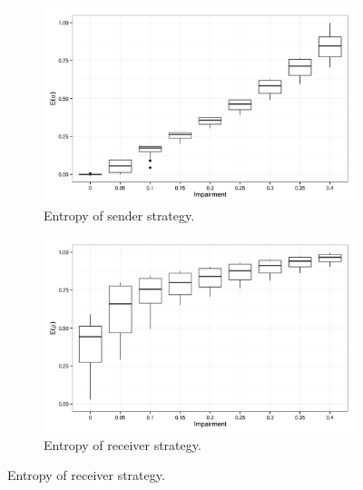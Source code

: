 \begin{figure}
        \centering
        \begin{subfigure}{0.45\textwidth}
                \includegraphics[width=\textwidth]{plots/Speaker-entropy-20140121-141158}
                \caption{Entropy of sender strategy.}
        \end{subfigure}
        \begin{subfigure}{0.45\textwidth}
                \includegraphics[width=\textwidth]{plots/Hearer-entropy-20140121-141158}
                \caption{Entropy of receiver strategy.}
        \end{subfigure}


\end{figure}
